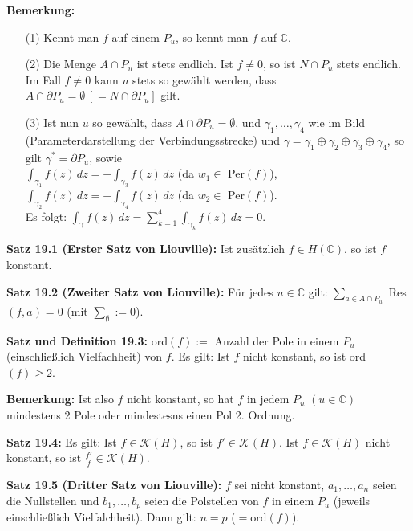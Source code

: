 \documentclass[11pt]{article}
\newcommand{\C}{\mathbb{C}}
\begin{document}
\textbf{Bemerkung:}
\vspace{-0.6cm}
\begin{itemize}
\item[(1)] Kennt man $f$ auf einem $P_u$, so kennt man $f$ auf $\C$. \vspace{-0.2cm}
\item[(2)] Die Menge $A \cap P_u$ ist stets endlich. Ist $f \neq 0$, so ist $N \cap P_u$ stets endlich. Im Fall $f \neq 0$ kann $u$ stets so gewählt werden, dass $A \cap \partial P_u = \emptyset \, [= N \cap \partial P_u]$ gilt. \vspace{-0.2cm}
\item[(3)] Ist nun $u$ so gewählt, dass $A \cap \partial P_u = \emptyset$, und $\gamma_1, \dots , \gamma_4$ wie im Bild (Parameterdarstellung der Verbindungsstrecke) und $\gamma = \gamma_1 \oplus \gamma_2 \oplus \gamma_3 \oplus \gamma_4$, so gilt $\gamma^* = \partial P_u$, sowie \\
 $\int_{\gamma_1} f(z) \, dz = - \int_{\gamma_3} f(z) \, dz$ (da $w_1 \in$ Per$(f)$), \\
$\int_{\gamma_2} f(z) \, dz = - \int_{\gamma_4} f(z) \, dz$ (da $w_2 \in$ Per$(f)$). \\
Es folgt: $\int_\gamma f(z) \, dz = \sum_{k=1}^4 \int_{\gamma_k} f(z) \, dz = 0$.
\end{itemize}
\vspace{-0.3cm}

\textbf{Satz 19.1 (Erster Satz von Liouville):} Ist zusätzlich $f \in H(\C)$, so ist $f$ konstant.

\textbf{Satz 19.2 (Zweiter Satz von Liouville):} Für jedes $u \in \C$ gilt: $\sum_{a \in A \cap P_u}$ Res$(f,a) = 0$ (mit $\sum_\emptyset := 0$).

\textbf{Satz und Definition 19.3:} ord$(f) := $ Anzahl der Pole in einem $P_u$ (einschließlich Vielfachheit) von $f$. Es gilt: Ist $f$ nicht konstant, so ist ord$(f) \geq 2$.

\textbf{Bemerkung:} Ist also $f$ nicht konstant, so hat $f$ in jedem $P_u$ $(u \in \C)$ mindestens 2 Pole oder mindestesns einen Pol 2. Ordnung.

\textbf{Satz 19.4:} Es gilt: Ist $f \in \mathcal{K}(H)$, so ist $f' \in \mathcal{K}(H)$. Ist  $f \in \mathcal{K}(H)$ nicht konstant, so ist $\frac{f'}{f} \in \mathcal{K}(H)$. 

\textbf{Satz 19.5 (Dritter Satz von Liouville):} $f$ sei nicht konstant, $a_1, \dots , a_n$ seien die Nullstellen und $b_1, \dots , b_p$ seien die Polstellen von $f$ in einem $P_u$ (jeweils einschließlich Vielfalchheit). Dann gilt: $n = p$ ($= \text{ord}(f)$).
\end{document}
